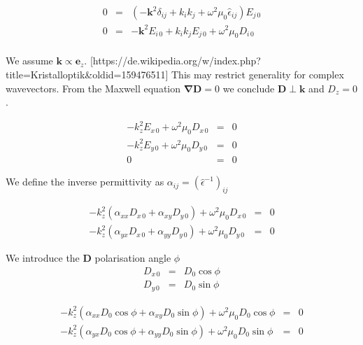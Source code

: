 \documentclass[12pt,a4paper,twoside,openright,BCOR10mm,headsepline,titlepage,abstracton,chapterprefix,final]{scrreprt}
\newcommand\Vector[1]{{\mathbf{#1}}}
\newcommand\wavenumber{k}
\newcommand\Wavevector{\Vector{\wavenumber}}
\newcommand\Nabla{\Vector{\nabla}}
\newcommand\Tensor[1]{\hat{#1}}
\newcommand\scalarDfield{D}
\newcommand\Dfield{\Vector{\scalarDfield}}
\newcommand\permittivity{\Tensor{\epsilon}}
\begin{document}
\begin{eqnarray}
 0 &=& \left(-\Vector{k}^2 \delta_{ij} + k_i k_j + \omega^2 \mu_0 \permittivity_{ij} \right) E_{j\,0} \\
 0 &=& -\Vector{k}^2 E_{i\,0} + k_i k_j E_{j\,0} + \omega^2 \mu_0 D_{i\,0} \\
\end{eqnarray}

We assume $\Wavevector \propto \Vector{e}_z$. [https://de.wikipedia.org/w/index.php?title=Kristalloptik\&oldid=159476511]
This may restrict generality for complex wavevectors.
From the Maxwell equation $\Nabla \Dfield = 0$ we conclude $\Dfield \perp \Wavevector$ and $\scalarDfield_z=0$.

\begin{eqnarray}
 - \wavenumber_z^2 E_{x\,0} + \omega^2 \mu_0 \scalarDfield_{x\,0} &=& 0\\ 
 - \wavenumber_z^2 E_{y\,0} + \omega^2 \mu_0 \scalarDfield_{y\,0} &=& 0\\
 0 &=& 0
\end{eqnarray}

We define the inverse permittivity as $\alpha_{ij} = (\permittivity^{-1})_{ij}$

\begin{eqnarray}
 - \wavenumber_z^2 (\alpha_{xx} \scalarDfield_{x\,0} + \alpha_{xy} \scalarDfield_{y\,0}) + \omega^2 \mu_0 \scalarDfield_{x\,0} &=& 0\\ 
 - \wavenumber_z^2 (\alpha_{yx} \scalarDfield_{x\,0} + \alpha_{yy} \scalarDfield_{y\,0}) + \omega^2 \mu_0 \scalarDfield_{y\,0} &=& 0
\end{eqnarray}

We introduce the $\Dfield$ polarisation angle $\phi$
\begin{eqnarray}
 \scalarDfield_{x\,0} &=& \scalarDfield_{0} \cos \phi \\
 \scalarDfield_{y\,0} &=& \scalarDfield_{0} \sin \phi
\end{eqnarray}

\begin{eqnarray}
 - \wavenumber_z^2 (\alpha_{xx} \scalarDfield_{0} \cos \phi + \alpha_{xy} \scalarDfield_{0} \sin \phi) + \omega^2 \mu_0 \scalarDfield_{0} \cos \phi &=& 0\\ 
 - \wavenumber_z^2 (\alpha_{yx} \scalarDfield_{0} \cos \phi + \alpha_{yy} \scalarDfield_{0} \sin \phi) + \omega^2 \mu_0 \scalarDfield_{0} \sin \phi &=& 0
\end{eqnarray}
\end{document}
